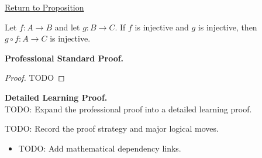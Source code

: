 \newpage
{}
\label{prf:composition-injective}

\begin{remark*}[Return]
\hyperref[prop:composition-injective]{Return to Proposition}
\end{remark*}

\begin{proposition*}
Let $f:A\to B$ and let $g:B\to C$. If $f$ is injective and $g$ is injective, then $g\circ f:A\to C$ is injective.
\end{proposition*}

\textbf{Professional Standard Proof.}~\\
\begin{proof}
TODO
\end{proof}

\textbf{Detailed Learning Proof.}~\\
TODO: Expand the professional proof into a detailed learning proof.

\begin{remark*}
TODO: Record the proof strategy and major logical moves.
\end{remark*}

\begin{dependencies}
\begin{itemize}
  \item TODO: Add mathematical dependency links.
\end{itemize}
\end{dependencies}

